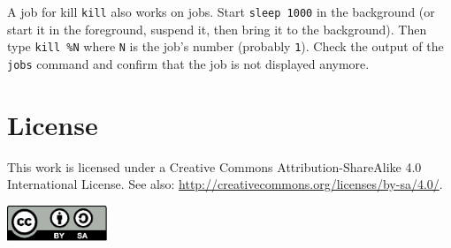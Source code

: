 \documentclass{TheAlternativeCourse}
\begin{document}
\begin{exercisebox}{A job for kill}
    \texttt{kill} also works on jobs. Start \texttt{sleep 1000} in the
    background (or start it in the foreground, suspend it, then bring it to the
    background). Then type \texttt{kill \%N} where \texttt{N} is the job's number
    (probably \texttt{1}). Check the output of the \texttt{jobs} command and
    confirm that the job is not displayed anymore.
\end{exercisebox}

\section{License}

This work is licensed under a Creative Commons Attribution-ShareAlike 4.0
International License. See also:
\url{http://creativecommons.org/licenses/by-sa/4.0/}.

\vspace{0cm}
\includegraphics[width=3cm]{assets/CC-BY-SA_icon.pdf}
\end{document}
